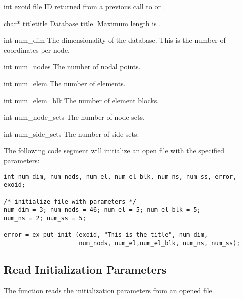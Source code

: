 
\begin{parameters}
\item[int exoid \R{}]
\exo{} file ID returned from a previous call to 
or .

\item[{char* titletitle \R{}}]
Database title. Maximum length is .

\item[{int num_dim \R{}}]
The dimensionality of the database. This is the number of coordinates
per node.

\item[{int num_nodes \R{}}]
The number of nodal points.

\item[{int num_elem \R{}}]
The number of elements.

\item[{int num_elem_blk \R{}}]
The number of element blocks.

\item[{int num_node_sets \R{}}]
The number of node sets.

\item[{int num_side_sets \R{}}]
The number of side sets.
\end{parameters}

The following code segment will initialize an open \exo{} file with
the specified parameters:

\begin{lstlisting}
int num_dim, num_nods, num_el, num_el_blk, num_ns, num_ss, error, exoid;

/* initialize file with parameters */
num_dim = 3; num_nods = 46; num_el = 5; num_el_blk = 5;
num_ns = 2; num_ss = 5;

error = ex_put_init (exoid, "This is the title", num_dim,
                     num_nods, num_el,num_el_blk, num_ns, num_ss);
\end{lstlisting}


\subsection{Read Initialization Parameters}

The function  reads the
initialization parameters from an opened
\exo{} file.

